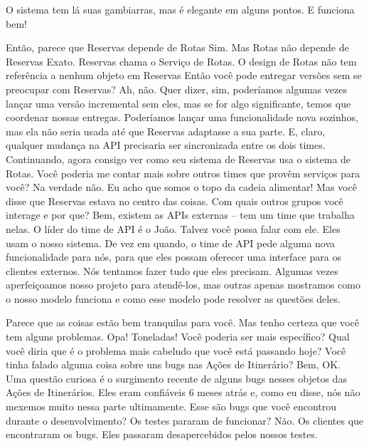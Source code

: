 \documentclass[12pt,play]{article}
\begin{document}
O sistema tem lá suas gambiarras, mas é elegante em alguns pontos. E funciona bem!

\narr
{}

\scene
\dani Então, parece que Reservas depende de Rotas
\alexgui Sim.
\dani Mas Rotas não depende de Reservas
\gui Exato. Reservas chama o Serviço de Rotas. O design de Rotas não tem referência a nenhum objeto em Reservas
\dani Então você pode entregar versões sem se preocupar com Reservas?
\gui Ah, não. Quer dizer, sim, poderíamos algumas vezes lançar uma versão incremental sem eles, mas se for algo significante, temos que coordenar nossas entregas. Poderíamos lançar uma funcionalidade nova sozinhos, mas ela não seria usada até que Reservas adaptasse a sua parte.
\alex E, claro, qualquer mudança na API precisaria ser sincronizada entre os dois times.
\dani Continuando, agora consigo ver como seu sistema de Reservas usa o sistema de Rotas. Você poderia me contar mais sobre outros times que provêm serviços para você?
\alex Na verdade não. Eu acho que somos o topo da cadeia alimentar!
\dani Mas você disse que Reservas estava no centro das coisas. Com quais outros grupos você interage e por que?
\alex Bem, existem as APIs externas -- tem um time que trabalha nelas. O líder do time de API é o João. Talvez você possa falar com ele. Eles usam o nosso sistema. De vez em quando, o time de API pede alguma nova funcionalidade para nós, para que eles possam oferecer uma interface para os clientes externos. Nós tentamos fazer tudo que eles precisam. Algumas vezes aperfeiçoamos nosso projeto para atendê-los, mas outras apenas mostramos como o nosso modelo funciona e como esse modelo pode resolver as questões deles.

\narr {}
\scene
\dani Parece que as coisas estão bem tranquilas para você. Mas tenho certeza que você tem alguns problemas.
\alex Opa! Toneladas! Você poderia ser mais específico?
\dani Qual você diria que é o problema mais cabeludo que você está passando hoje?
\gui Você tinha falado alguma coisa sobre uns bugs nas Ações de Itinerário?
\alex Bem, OK. Uma questão curiosa é o surgimento recente de alguns bugs nesses objetos das Ações de Itinerários. Eles eram confiáveis 6 meses atrás e, como eu disse, nós não mexemos muito nessa parte ultimamente.
\dani Esse são bugs que você encontrou durante o desenvolvimento? Os testes pararam de funcionar?
\alex {} Não. Os clientes que encontraram os bugs. Eles passaram desapercebidos pelos nossos testes.
\end{document}
